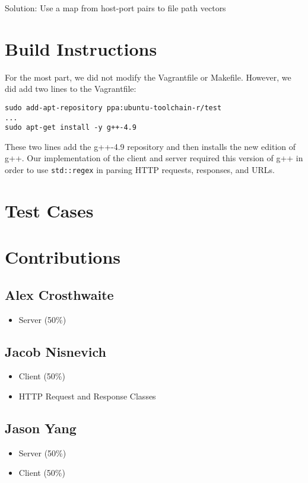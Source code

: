 \documentclass{article}
\begin{document}
\noindent
Solution: Use a map from host-port pairs to file path vectors

\section{Build Instructions}

For the most part, we did not modify the Vagrantfile or Makefile. However, we did add two lines to the Vagrantfile:

\begin{lstlisting}
sudo add-apt-repository ppa:ubuntu-toolchain-r/test
...
sudo apt-get install -y g++-4.9
\end{lstlisting}

\noindent
These two lines add the g++-4.9 repository and then installs the new edition of g++. Our implementation of the client and server required this version of g++ in order to use \texttt{std::regex} in parsing HTTP requests, responses, and URLs.

\section{Test Cases}

\section{Contributions}

\subsection{Alex Crosthwaite}

\begin{itemize}
	\item Server (50\%)
\end{itemize}

\subsection{Jacob Nisnevich}

\begin{itemize}
	\item Client (50\%)
	\item HTTP Request and Response Classes
\end{itemize}

\subsection{Jason Yang}

\begin{itemize}
	\item Server (50\%)
	\item Client (50\%)
\end{itemize}
\end{document}
